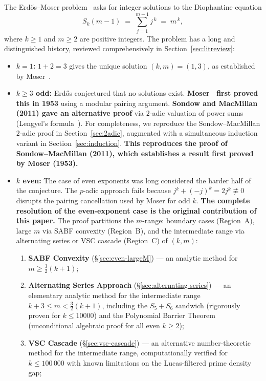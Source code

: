 \documentclass[12pt,a4paper]{article}
\theoremstyle{plain}
\theoremstyle{definition}
\begin{document}
The Erd\H{o}s--Moser problem~\cite{ErdosMoser} asks for integer solutions to
the Diophantine equation
\begin{equation}\label{eq:EM}
  S_k(m-1) \;=\; \sum_{j=1}^{m-1} j^{\,k} \;=\; m^{\,k},
\end{equation}
where $k \ge 1$ and $m \ge 2$ are positive integers.  The problem has a long
and distinguished history, reviewed comprehensively in
Section~\ref{sec:litreview}:

\begin{itemize}[nosep]
  \item \textbf{$k=1$:}  $1+2 = 3$ gives the unique solution
    $(k,m) = (1,3)$, as established by Moser~\cite{Moser}.
  \item \textbf{$k \ge 3$ odd:}  Erd\H{o}s conjectured that no solutions
    exist.  \textbf{Moser~\cite{Moser} first proved this in 1953}
    using a modular pairing argument.  \textbf{Sondow and
    MacMillan~\cite{SondowMacMillan} (2011) gave an alternative proof}
    via $2$-adic valuation of power sums (Lengyel's formula~\cite{Lengyel}).
    For completeness, we reproduce the Sondow--MacMillan $2$-adic proof
    in Section~\ref{sec:2adic}, augmented with a simultaneous induction
    variant in Section~\ref{sec:induction}.
    \textbf{This reproduces the proof of
    Sondow--MacMillan (2011), which establishes a result first
    proved by Moser (1953).}
  \item \textbf{$k$ even:}  The case of even exponents was long considered
    the harder half of the conjecture.  The $p$-adic approach fails because
    $j^k + (-j)^k = 2j^k \not\equiv 0$ disrupts the pairing cancellation
    used by Moser for odd $k$.
    \textbf{The complete resolution of the even-exponent case is the
    original contribution of this paper.}
    The proof partitions the $m$-range: boundary cases (Region~A), large $m$ via SABF convexity (Region~B), and the intermediate range via alternating series or VSC cascade (Region~C)
    of $(k,m)$:
    \begin{enumerate}[label=(\Roman*), nosep]
      \item \textbf{SABF Convexity} (\S\ref{sec:even-largeM}) ---
        an analytic method for $m \ge \frac{3}{2}(k+1)$;
      \item \textbf{Alternating Series Approach} (\S\ref{sec:alternating-series}) ---
        an elementary analytic method for the intermediate range
        $k+3 \le m < \frac{3}{2}(k+1)$, including the $S_5+S_6$ sandwich
        (rigorously proven for $k \le 10000$) and the Polynomial Barrier
        Theorem (unconditional algebraic proof for all even $k \ge 2$);
      \item \textbf{VSC Cascade} (\S\ref{sec:vsc-cascade}) ---
        an alternative number-theoretic method for the intermediate range,
        computationally verified for $k \le 100\,000$ with known
        limitations on the Lucas-filtered prime density gap;
    \end{enumerate}
\end{itemize}
\end{document}
